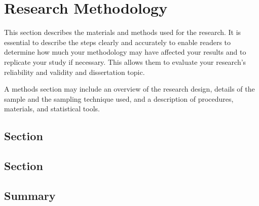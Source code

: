\chapter {Research Methodology}
\label{label6}

This section describes the materials and methods used for the research. It is essential to describe the steps clearly and accurately to enable readers to determine how much your methodology may have affected your results and to replicate your study if necessary. This allows them to evaluate your research's reliability and validity and dissertation topic.

A methods section may include an overview of the research design, details of the sample and the sampling technique used, and a description of procedures, materials, and statistical tools.



\section{Section}
\label{label7}


\section{Section}
\label{label8}


\section{Summary}
\label{label9}
